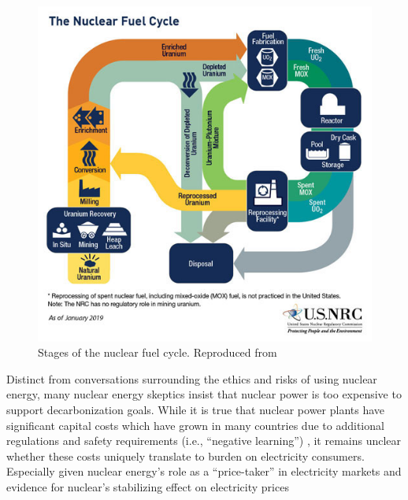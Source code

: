 \begin{figure}[ht]
    \label{fig:nuclear-fuel-cycle}
    \centering
    \includegraphics[width=0.5\columnwidth]{figures/nuclear-fuel-cycle-02.jpeg}
    \caption{Stages of the nuclear fuel cycle. Reproduced from \cite{nuclear_regulatory_commission_stages_2020}}
\end{figure}


Distinct from conversations surrounding the ethics and risks of using nuclear
energy, many nuclear energy skeptics insist that nuclear power is too expensive
to support decarbonization goals. While it is true that nuclear power plants
have significant capital costs \cite{nrel_2020_2020} which have grown in many
countries due to additional regulations and safety requirements (i.e.,
``negative learning'') \cite{lovering_historical_2016}, it remains unclear
whether these costs uniquely translate to burden on electricity consumers.
Especially given nuclear energy's role as a ``price-taker'' in electricity
markets \cite{murphy_impacts_2019} and evidence for nuclear's stabilizing effect
on electricity prices \cite{dotson_influence_2022,de_sisternes_value_2016}